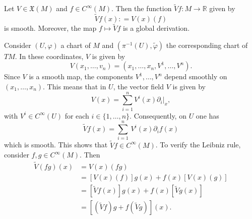 \documentclass{ximera}
\begin{document}
    \begin{proposition}
        Let $V  \in \mathfrak{X} (M)$  and $f \in C^{\infty} (M)$. Then the function $\tilde{V}f : M \to \mathbb{R}$ given by 
        \[       \tilde{V}f (x) : = V(x) (f)    \]
        is smooth. Moreover, the map $f \mapsto \tilde{V}f$ is a global derivation.

    \begin{solution}
        Consider  $(U, \varphi)$ a chart of $M$ and  $(\pi ^{-1}(U), \tilde{\varphi}) $ the corresponding chart of $TM$. In these coordinates, $V$ is given by 
        \[   V ( x_1 , \ldots , v_n ) = ( x_1 , \ldots , x_n , V^1 , \ldots , V^n ) .  \]
        Since $V$ is a smooth map, the components $V^1, \ldots, V^n$ depend smoothly on $(x_1, \ldots , x_n)$.     This means that in $U$, the vector field $V$ is given by 
        \[   V(x)   = \sum_{i = 1} ^n V^i (x) \partial_i \vert _x  ,    \]
        with $V^i \in C^{\infty} (U) $ for each $i\in \{ 1, \ldots , n \}$.      
        Consequently, on $U$ one has
        \[       \tilde{V}f (x) = \sum _{i = 1 } ^n \, V^i (x) \partial _i f (x)       \]
        which is smooth. This shows that $\tilde{V}f \in C^{\infty}(M)$. To verify the Leibniz rule, consider $f,g \in C^{\infty} (M)$. Then
        \begin{align*}
            \tilde{V}(fg) (x) & = V(x) (fg) \\
                    & = [ V(x) (f)] g(x) + f(x) [V(x)( g)] \\
                    & = [ \tilde{V}f (x) ] g(x) + f(x) [\tilde{V}g (x)] \\
                    & = [ ( \tilde{V}f) g + f (\tilde{V}g) ] (x) .
        \end{align*}    
    \end{solution}
    \end{proposition}
\end{document}
